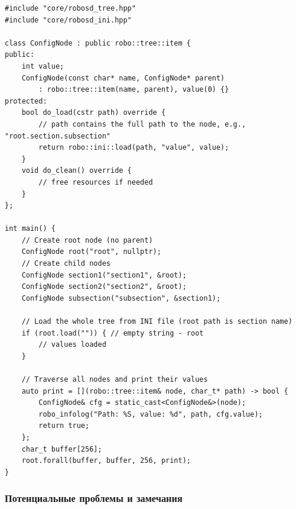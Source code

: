 \documentclass[a4paper,12pt]{article}
\begin{document}
\begin{lstlisting}[caption={Configuration tree example}]
#include "core/robosd_tree.hpp"
#include "core/robosd_ini.hpp"

class ConfigNode : public robo::tree::item {
public:
    int value;
    ConfigNode(const char* name, ConfigNode* parent)
        : robo::tree::item(name, parent), value(0) {}
protected:
    bool do_load(cstr path) override {
        // path contains the full path to the node, e.g., "root.section.subsection"
        return robo::ini::load(path, "value", value);
    }
    void do_clean() override {
        // free resources if needed
    }
};

int main() {
    // Create root node (no parent)
    ConfigNode root("root", nullptr);
    // Create child nodes
    ConfigNode section1("section1", &root);
    ConfigNode section2("section2", &root);
    ConfigNode subsection("subsection", &section1);

    // Load the whole tree from INI file (root path is section name)
    if (root.load("")) { // empty string - root
        // values loaded
    }

    // Traverse all nodes and print their values
    auto print = [](robo::tree::item& node, char_t* path) -> bool {
        ConfigNode& cfg = static_cast<ConfigNode&>(node);
        robo_infolog("Path: %S, value: %d", path, cfg.value);
        return true;
    };
    char_t buffer[256];
    root.forall(buffer, buffer, 256, print);
}
\end{lstlisting}

\subsubsection{Потенциальные проблемы и замечания}
\end{document}

